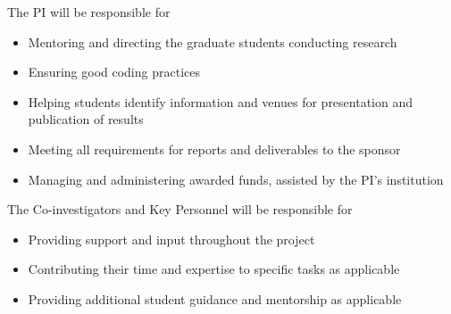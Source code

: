 \documentclass[12pt]{article}
\begin{document}
The PI will be responsible for
\begin{itemize}[noitemsep]
\item Mentoring and directing the graduate students conducting research
\item Ensuring good coding practices
\item Helping students identify information and venues for presentation and publication of results
\item Meeting all requirements for reports and deliverables to the sponsor
\item Managing and administering awarded funds, assisted by the PI's institution
\end{itemize}

The Co-investigators and Key Personnel will be responsible for
\begin{itemize}[noitemsep]
\item Providing support and input throughout the project
\item Contributing their time and expertise to specific tasks as applicable
\item Providing additional student guidance and mentorship as applicable
\end{itemize}
\end{document}
